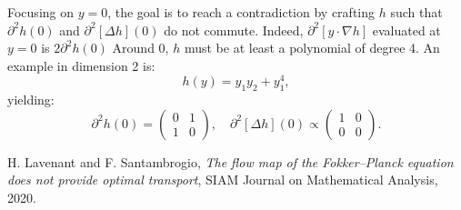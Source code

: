 \documentclass{article}
\begin{document}
Focusing on $y = 0$, the goal is to reach a contradiction by crafting $h$ such that  $\partial^2 h(0)$  and   $\partial^2[\Delta h](0)$ do not commute. 
%
Indeed, $\partial^2[y \cdot \nabla h]$ evaluated at $y=0$ is $2 \partial^2 h(0)$
Around $0$, $h$ must be at least a polynomial of degree 4. An example in dimension 2 is:
\[
    h(y) = y_1 y_2 + y_1^4,
\]
yielding:
\[
    \partial^2 h(0) = \begin{pmatrix} 0 & 1 \\ 1 & 0 \end{pmatrix}, \quad 
    \partial^2[\Delta h](0) \propto \begin{pmatrix} 1 & 0 \\ 0 & 0 \end{pmatrix}.
\]

\begin{thebibliography}{9}
    H. Lavenant and F. Santambrogio, \emph{The flow map of the Fokker--Planck equation does not provide optimal transport}, SIAM Journal on Mathematical Analysis, 2020.
\end{thebibliography}
\end{document}
